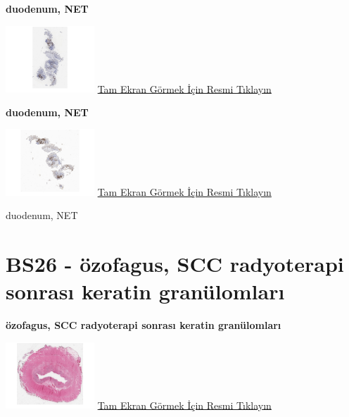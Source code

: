 \documentclass[
  letterpaper,
  DIV=11,
  numbers=noendperiod]{scrreprt}
\begin{document}
\textbf{duodenum, NET}

\href{https://images.patolojiatlasi.com/BS25/CHR.html}{\includegraphics[width=0.25\textwidth,height=\textheight]{./screenshots/BS25-CHR_screenshot.png}}
\href{https://images.patolojiatlasi.com/BS25/CHR.html}{Tam Ekran Görmek
İçin Resmi Tıklayın}

\textbf{duodenum, NET}

\href{https://images.patolojiatlasi.com/BS25/SYN.html}{\includegraphics[width=0.25\textwidth,height=\textheight]{./screenshots/BS25-SYN_screenshot.png}}
\href{https://images.patolojiatlasi.com/BS25/SYN.html}{Tam Ekran Görmek
İçin Resmi Tıklayın}

\begin{tcolorbox}[enhanced jigsaw, left=2mm, toprule=.15mm, rightrule=.15mm, bottomrule=.15mm, leftrule=.75mm, colback=white, colframe=quarto-callout-tip-color-frame, toptitle=1mm, breakable, titlerule=0mm, colbacktitle=quarto-callout-tip-color!10!white, bottomtitle=1mm, title=\textcolor{quarto-callout-tip-color}{\faLightbulb}\hspace{0.5em}{Tanı}, arc=.35mm, opacitybacktitle=0.6, opacityback=0, coltitle=black]

duodenum, NET

\end{tcolorbox}

\hypertarget{sec-BS26}{%
\section{BS26 - özofagus, SCC radyoterapi sonrası keratin
granülomları}\label{sec-BS26}}

\textbf{özofagus, SCC radyoterapi sonrası keratin granülomları}

\href{https://images.patolojiatlasi.com/BS26/HE.html}{\includegraphics[width=0.25\textwidth,height=\textheight]{./screenshots/BS26-HE_screenshot.png}}
\href{https://images.patolojiatlasi.com/BS26/HE.html}{Tam Ekran Görmek
İçin Resmi Tıklayın}
\end{document}
